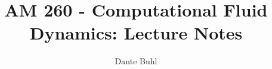 \documentclass{article}
\begin{document}
\title{AM 260 - Computational Fluid Dynamics: Lecture Notes}
\author{Dante Buhl}
\doublespacing
\newcommand{\wrms}{w_{\text{rms}}}
\newcommand{\bs}[1]{\boldsymbol{#1}}
\newcommand{\tb}[1]{\textbf{#1}}
\newcommand{\bmp}[1]{\begin{minipage}{#1\textwidth}}
\newcommand{\emp}{\end{minipage}}
\newcommand{\R}{\mathbb{R}}
\newcommand{\C}{\mathbb{C}}
\newcommand{\N}{\mathcal{N}}
\newcommand{\K}{\bs{\mathrm{K}}}
\newcommand{\m}{\bs{\mu}_*}
\newcommand{\s}{\bs{\Sigma}_*}
\newcommand{\dt}{\Delta t}
\newcommand{\dx}{\Delta x}
\newcommand{\tr}[1]{\text{Tr}(#1)}
\newcommand{\Tr}[1]{\text{Tr}(#1)}
\newcommand{\Div}{\nabla \cdot}
\renewcommand{\div}{\nabla \cdot}
\newcommand{\Curl}{\nabla \times}
\newcommand{\Grad}{\nabla}
\newcommand{\grad}{\nabla}
\newcommand{\grads}{\nabla_s}
\newcommand{\gradf}{\nabla_f}
\newcommand{\xs}{x_s}
\newcommand{\xf}{x_f}
\newcommand{\x}{\bs{x}}
\newcommand{\ts}{t_s}
\newcommand{\tf}{t_f}
\newcommand{\pt}{\partial t}
\newcommand{\pz}{\partial z}
\newcommand{\uvec}{\bs{u}}
\newcommand{\nvec}{\hat{\bs{n}}}
\newcommand{\jvec}{\bs{j}}
\newcommand{\bvec}{\bs{B}}
\newcommand{\B}{\bs{B}}
\newcommand{\evec}{\bs{E}}
\newcommand{\E}{\bs{E}}
\newcommand{\vort}{\bs{\omega}}
\newcommand{\F}{\bs{F}}
\newcommand{\T}{\tilde{T}}
\newcommand{\ez}{\bs{e}_z}
\newcommand{\ex}{\bs{e}_x}
\newcommand{\ey}{\bs{e}_y}
\newcommand{\thetahat}{\hat{\bs{\theta}}}
\newcommand{\rhat}{\hat{\bs{r}}}
\newcommand{\zhat}{\hat{\bs{z}}}
\newcommand{\eo}{\bs{e}_{\bs{\Omega}}}
\newcommand{\ppt}[1]{\frac{\partial #1}{\partial t}}
\newcommand{\pptwo}[2]{\frac{\partial^2 #1}{\partial #2^2}}
\newcommand{\ppthree}[2]{\frac{\partial^3 #1}{\partial #2^3}}
\newcommand{\pp}[2]{\frac{\partial #1}{\partial #2}}
\newcommand{\ddt}[1]{\frac{d #1}{d t}}
\newcommand{\DDt}[1]{\frac{D #1}{D t}}
\newcommand{\DD}[2]{\frac{D #1}{D #2}}
\newcommand{\ppts}[1]{\frac{\partial #1}{\partial t_s}}
\newcommand{\pptf}[1]{\frac{\partial #1}{\partial t_f}}
\newcommand{\ppz}[1]{\frac{\partial #1}{\partial z}}
\newcommand{\ddz}[1]{\frac{d #1}{d z}}
\newcommand{\dd}[2]{\frac{d #1}{d #2}}
\newcommand{\ppzetas}[1]{\frac{\partial^2 #1}{\partial \zeta^2}}
\newcommand{\ppzs}[1]{\frac{\partial #1}{\partial z_s}}
\newcommand{\ppzf}[1]{\frac{\partial #1}{\partial z_f}}
\newcommand{\ppx}[1]{\frac{\partial #1}{\partial x}}
\newcommand{\ppxi}[1]{\frac{\partial #1}{\partial x_i}}
\newcommand{\ppxj}[1]{\frac{\partial #1}{\partial x_j}}
\newcommand{\ppy}[1]{\frac{\partial #1}{\partial y}}
\newcommand{\ppzeta}[1]{\frac{\partial #1}{\partial \zeta}}
\end{document}
